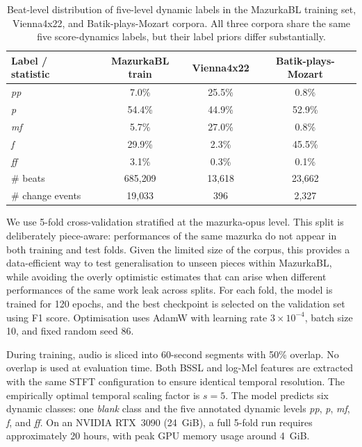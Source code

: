 \begin{table}[!htbp]
\centering
\setlength{\tabcolsep}{7pt}          %
\fontsize{11pt}{14pt}\selectfont     %
\renewcommand{\arraystretch}{1.2}    %
\caption{Beat-level distribution of five-level dynamic labels in the MazurkaBL training set, Vienna4x22, and Batik-plays-Mozart corpora. All three corpora share the same five score-dynamics labels, but their label priors differ substantially.}
\label{tab:audiodyn_label_priors}
\begin{tabular}{|l|c|c|c|}
\hline
\textbf{Label / statistic} & \textbf{MazurkaBL train} & \textbf{Vienna4x22} & \textbf{Batik-plays-Mozart} \\
\hline
\textit{pp} & 7.0\% & 25.5\% & 0.8\% \\
\textit{p}  & 54.4\% & 44.9\% & 52.9\% \\
\textit{mf} & 5.7\% & 27.0\% & 0.8\% \\
\textit{f}  & 29.9\% & 2.3\% & 45.5\% \\
\textit{ff} & 3.1\% & 0.3\% & 0.1\% \\
\hline
\# beats & 685{,}209 & 13{,}618 & 23{,}662 \\
\# change events & 19{,}033 & 396 & 2{,}327 \\
\hline
\end{tabular}
\end{table}

We use 5-fold cross-validation stratified at the mazurka-opus level. This split is deliberately piece-aware: performances of the same mazurka do not appear in both training and test folds. Given the limited size of the corpus, this provides a data-efficient way to test generalisation to unseen pieces within MazurkaBL, while avoiding the overly optimistic estimates that can arise when different performances of the same work leak across splits. For each fold, the model is trained for 120 epochs, and the best checkpoint is selected on the validation set using F1 score. Optimisation uses AdamW with learning rate $3 \times 10^{-4}$, batch size 10, and fixed random seed 86.

During training, audio is sliced into 60-second segments with 50\% overlap. No overlap is used at evaluation time. Both BSSL and log-Mel features are extracted with the same STFT configuration to ensure identical temporal resolution. The empirically optimal temporal scaling factor is $s=5$. The model predicts six dynamic classes: one \textit{blank} class and the five annotated dynamic levels \textit{pp}, \textit{p}, \textit{mf}, \textit{f}, and \textit{ff}. On an NVIDIA RTX~3090 (24~GiB), a full 5-fold run requires approximately 20 hours, with peak GPU memory usage around 4~GiB.

